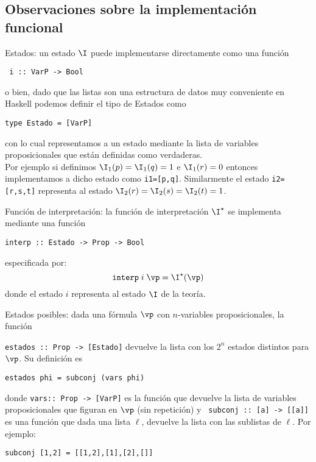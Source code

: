 \documentclass[11pt,letterpaper]{article}
\begin{document}
\subsection{Observaciones sobre la implementaci\'on funcional}

\bi
\item Estados: un estado $\I$ puede implementarse directamente como una 
funci\'on 
\begin{verbatim}
 i :: VarP -> Bool 
\end{verbatim}
o bien, dado que las listas son una estructura de datos muy conveniente en {\sc 
Haskell} podemos definir el  tipo de Estados como
\begin{verbatim}
type Estado = [VarP] 
\end{verbatim}
con lo cual representamos a un estado mediante la lista de variables 
proposicionales que est\'an definidas como verdaderas. \\
Por ejemplo si definimos $\I_1(p)=\I_1(q)=1$ e $\I_1(r)=0$ entonces 
implementamos a dicho estado como \verb~i1=[p,q]~. 
Similarmente el estado \verb~i2=[r,s,t]~ representa al estado 
$\I_2(r)=\I_2(s)=\I_2(t)=1$. 

\item Funci\'on de interpretaci\'on: la funci\'on de interpretaci\'on 
$\I^\star$ se implementa mediante una funci\'on 
\begin{verbatim}
interp :: Estado -> Prop -> Bool 
\end{verbatim}
especificada por: $$ {\tt interp}\;i\;\vp = \I^\star(\vp) $$ 
donde el estado $i$ representa al estado $\I$ de la teor\'ia.

\item Estados posibles: dada una f\'ormula $\vp$ con $n$-variables 
proposicionales, la funci\'on 

\verb~estados :: Prop -> [Estado]~
devuelve la lista con los $2^n$ estados distintos para $\vp$. 
Su definici\'on es  %
\begin{verbatim}
estados phi = subconj (vars phi)
\end{verbatim}
donde \verb~vars:: Prop -> [VarP]~ es la funci\'on que 
devuelve la lista de variables proposicionales que figuran en $\vp$ (sin 
repetici\'on) y \verb= subconj :: [a] -> [[a]]= es una funci\'on que dada una 
lista $\ell$, devuelve la lista con las sublistas de $\ell$. Por ejemplo:
\begin{verbatim}
subconj [1,2] = [[1,2],[1],[2],[]] 
\end{verbatim}
\ei
\end{document}
